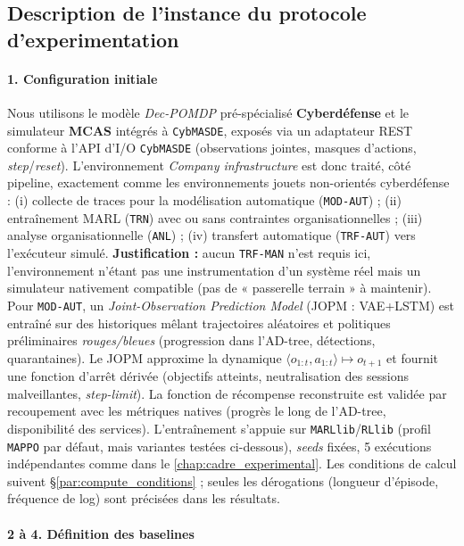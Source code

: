 \subsection{Description de l'instance du protocole d'experimentation}

\paragraph{1. Configuration initiale}

Nous utilisons le modèle \emph{Dec-POMDP} pré-spécialisé \textbf{Cyberdéfense} et le simulateur \textbf{MCAS} intégrés à \texttt{CybMASDE}, exposés via un adaptateur REST conforme à l’API d’I/O \texttt{CybMASDE} (observations jointes, masques d’actions, \emph{step}/\emph{reset}). L’environnement \emph{Company infrastructure} est donc traité, côté pipeline, exactement comme les environnements jouets non-orientés cyberdéfense : (i) collecte de traces pour la modélisation automatique (\texttt{MOD-AUT}) ; (ii) entraînement MARL (\texttt{TRN}) avec ou sans contraintes organisationnelles ; (iii) analyse organisationnelle (\texttt{ANL}) ; (iv) transfert automatique (\texttt{TRF-AUT}) vers l’exécuteur simulé.
\textbf{Justification :} aucun \texttt{TRF-MAN} n’est requis ici, l’environnement n’étant pas une instrumentation d’un système réel mais un simulateur nativement compatible (pas de « passerelle terrain » à maintenir).
Pour \texttt{MOD-AUT}, un \emph{Joint-Observation Prediction Model} (JOPM : VAE+LSTM) est entraîné sur des historiques mêlant trajectoires aléatoires et politiques préliminaires \emph{rouges/bleues} (progression dans l’AD-tree, détections, quarantaines). Le JOPM approxime la dynamique $\langle o_{1:t},a_{1:t} \rangle \mapsto o_{t+1}$ et fournit une fonction d’arrêt dérivée (objectifs atteints, neutralisation des sessions malveillantes, \emph{step-limit}). La fonction de récompense reconstruite est validée par recoupement avec les métriques natives (progrès le long de l’AD-tree, disponibilité des services). L’entraînement s’appuie sur \texttt{MARLlib}/\texttt{RLlib} (profil \texttt{MAPPO} par défaut, mais variantes testées ci-dessous), \emph{seeds} fixées, 5 exécutions indépendantes comme dans le \autoref{chap:cadre_experimental}. Les conditions de calcul suivent \S\ref{par:compute_conditions} ; seules les dérogations (longueur d’épisode, fréquence de log) sont précisées dans les résultats.

\paragraph{2 à 4. Définition des baselines}

